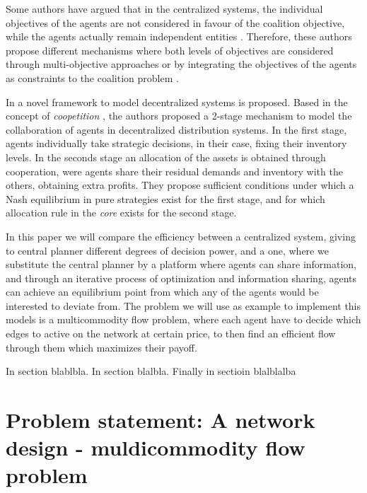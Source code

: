 \documentclass[review]{elsarticle}
\begin{document}
Some authors have argued that in the centralized systems, the individual
objectives of the agents are not considered in favour of the coalition
objective, while the agents actually remain independent entities
\cite{DEFRYN2018891}. Therefore, these authors propose different mechanisms where
both levels of objectives are considered through multi-objective approaches
\cite{DEFRYN20191} or by integrating the objectives of the agents as constraints
to the coalition problem \cite{VANOVERMEIRE2014125}.

In \cite{ANUPINDI2001} a novel framework to model decentralized systems is
proposed. Based in the concept of \emph{coopetition} \cite{BRANDENBURGER1996},
the authors proposed a 2-stage mechanism to model the collaboration of agents in
decentralized distribution systems. In the first stage, agents individually
take strategic decisions, in their case, fixing their inventory levels. In the
seconds stage an allocation of the assets is obtained through cooperation, were
agents share their residual demands and inventory with the others, obtaining
extra profits. They propose sufficient conditions under which a Nash equilibrium
in pure strategies exist for the first stage, and for which allocation rule in
the \emph{core} exists for the second stage.



In this paper we will compare the efficiency between a centralized system,
giving to central planner different degrees of decision power, and a
 one, where we substitute the central planner by a platform where
agents can share information, and through an iterative process of optimization
and information sharing, agents can achieve an equilibrium point from which any
of the agents would be interested to deviate from. The problem we
will use as example to implement this models is a multicommodity flow problem,
where each agent have to decide which edges to active on the network at certain
price, to then find an efficient flow through them which maximizes their
payoff.

In section blablbla. In section blalbla. Finally in sectioin blalblalba


\section{Problem statement: A network design - muldicommodity flow problem}
\end{document}
